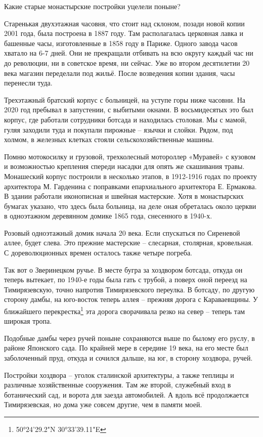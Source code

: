 Какие старые монастырские постройки уцелели поныне?

Старенькая двухэтажная часовня, что стоит над склоном, позади новой копии 2001 года, была построена в 1887 году. Там располагалась церковная лавка и башенные часы, изготовленные в 1858 году в Париже. Одного завода часов хватало на 6-7 дней. Они не прекращали отбивать на всю округу каждый час ни до революции, ни в советское время, ни сейчас. Уже во втором десятилетии 20 века магазин переделали под жильё. После возведения копии здания, часы перенесли туда.

Трехэтажный братский корпус с больницей, на уступе горы ниже часовни. На 2020 год пребывал в запустении, с выбитыми окнами. В восьмидесятых это был корпус, где работали сотрудники ботсада и находилась столовая. Мы с мамой, гуляя заходили туда и покупали пирожные – язычки и слойки. Рядом, под холмом, в железных клетках стояли сельскохозяйственные машины. 

Помню мотокосилку и грузовой, трехколесный мотороллер «Муравей» с кузовом и возможностью крепления спереди насадки для опять же скашивания травы. Монашеский корпус построили в несколько этапов, в 1912-1916 годах по проекту архитектора М. Гарденина с поправками епархиального архитектора Е. Ермакова. В здании работали иконописная и швейная мастерские. Хотя в монастырских бумагах указано, что здесь была больница, на деле оная обреталась около церкви в одноэтажном деревянном домике 1865 года, снесенного в 1940-х.

Розовый одноэтажный домик начала 20 века. Если спускаться по Сиреневой аллее, будет слева. Это прежние мастерские – слесарная, столярная, кровельная. С дореволюционных времен осталось также четыре погреба.

Так вот о Зверинецком ручье. В месте бугра за хоздвором ботсада, откуда он теперь вытекает, по 1940-е годы была гать с трубой, а поверх оной переезд на Тимирязевскую, точно напротив Тимирязевского переулка. В ботсаду, по другую сторону дамбы, на юго-восток теперь аллея – прежняя дорога с Караваевщины. У ближайшего перекрестка\footnote{50°24'29.2"N 30°33'39.11"E} эта дорога сворачивала резко на север – теперь там широкая тропа.

Подобные дамбы через ручей поныне сохраняются выше по былому его руслу, в районе Японского сада. По крайней мере в середине 19 века, на его месте был заболоченный пруд, откуда и сочился дальше, на юг, в сторону хоздвора, ручей.

Постройки хоздвора – уголок сталинской архитектуры, а также теплицы и различные хозяйственные сооружения. Там же второй, служебный вход в ботанический сад, и ворота для заезда автомобилей. А вдоль всё продолжается Тимирязевская, но дома уже совсем другие, чем в памяти моей.

